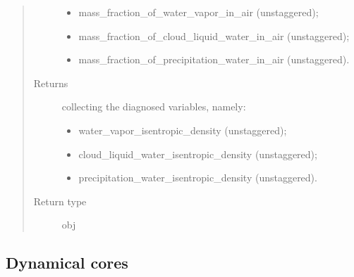 \documentclass[letterpaper,10pt,english]{sphinxmanual}
\begin{document}
\begin{fulllineitems}
\begin{fulllineitems}
\begin{quote}
\begin{description}
\begin{itemize}
\item {} 
mass\_fraction\_of\_water\_vapor\_in\_air (unstaggered);

\item {} 
mass\_fraction\_of\_cloud\_liquid\_water\_in\_air (unstaggered);

\item {} 
mass\_fraction\_of\_precipitation\_water\_in\_air (unstaggered).

\end{itemize}


\item[{Returns}] \leavevmode

{\hyperref[\detokenize{api:storages.grid_data.GridData}]{}} collecting the diagnosed variables, namely:
\begin{itemize}
\item {} 
water\_vapor\_isentropic\_density (unstaggered);

\item {} 
cloud\_liquid\_water\_isentropic\_density (unstaggered);

\item {} 
precipitation\_water\_isentropic\_density (unstaggered).

\end{itemize}


\item[{Return type}] \leavevmode
obj

\end{description}\end{quote}

\end{fulllineitems}


\end{fulllineitems}



\subsection{Dynamical cores}
\label{\detokenize{api:dynamical-cores}}
\end{document}
